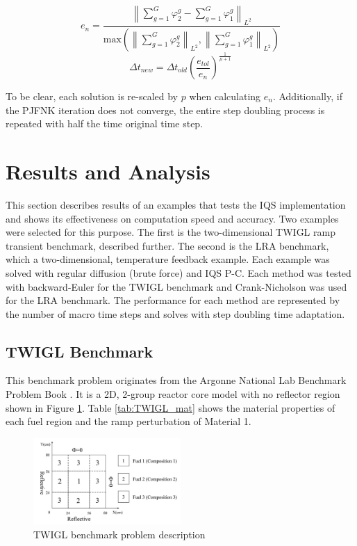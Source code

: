\documentclass{anstrans}
\newcommand{\be}{\begin{equation}}
\newcommand{\ee}{\end{equation}}
\newcommand{\norm}[1]{\left\lVert#1\right\rVert_{L^2}}
\begin{document}
\be
e_n = \frac{\norm{\sum_{g=1}^G\varphi^g_2 - \sum_{g=1}^G\varphi^g_1}}{\text{max}\left(\norm{\sum_{g=1}^G\varphi^g_2},\norm{\sum_{g=1}^G\varphi^g_1}\right)}
\label{eq:edt2}
\ee
\be
\Delta t_{new} = \Delta t_{old} \left(\frac{e_{tol}}{e_n}\right)^{\frac{1}{\mu+1}}
\label{eq:dt2}
\ee

To be clear, each solution is re-scaled by $p$ when calculating $e_n$.  Additionally, if the PJFNK iteration does not converge, the entire step doubling process is repeated with half the time original time step. 

\section{Results and Analysis}
This section describes results of an examples that tests the IQS implementation and shows its effectiveness on computation speed and accuracy.  Two examples were selected for this purpose.  The first is the two-dimensional TWIGL ramp transient benchmark, described further.  The second is the LRA benchmark, which a two-dimensional, temperature feedback example.  Each example was solved with regular diffusion (brute force) and IQS P-C.  Each method was tested with backward-Euler for the TWIGL benchmark and Crank-Nicholson was used for the LRA benchmark.  The performance for each method are represented by the number of macro time steps and solves with step doubling time adaptation.

\subsection{TWIGL Benchmark}

This benchmark problem originates from the Argonne National Lab Benchmark Problem Book \cite{BPB}.  It is a 2D, 2-group reactor core model with no reflector region shown in Figure \ref{fig:TWIGL_reg}.  Table \ref{tab:TWIGL_mat} shows the material properties of each fuel region and the ramp perturbation of Material 1.

\begin{figure}[!htbp]
\begin{center}
\includegraphics[width=0.5\textwidth]{TWIGL_regions.jpg}
\caption{TWIGL benchmark problem description}
\label{fig:TWIGL_reg}
\end{center}
\end{figure}
\end{document}

